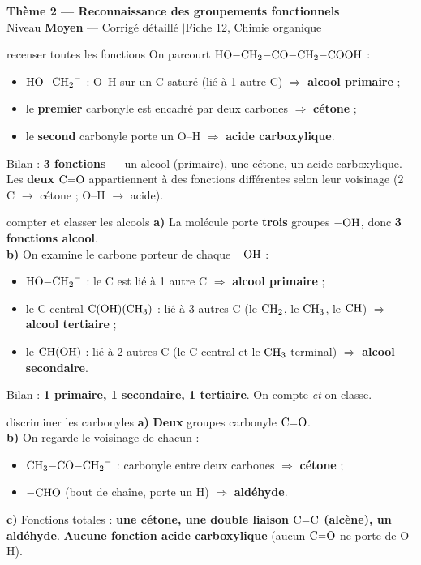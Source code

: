 \documentclass[11pt,a4paper]{article}
\newcommand{\rep}[1]{\textcolor{primarydark}{\textbf{#1}}}
\newcommand{\banner}[2]{%
\begin{tcolorbox}[enhanced,colback=excol,colframe=excol,arc=5pt,boxrule=0pt,
   left=5mm,right=5mm,top=2.5mm,bottom=2.5mm,coltext=white]
{\large\bfseries #1}\\[1pt]{\small #2}
\end{tcolorbox}\vspace{2pt}}
\begin{document}
\banner{Thème 2 — Reconnaissance des groupements fonctionnels}{Niveau \textbf{Moyen} — Corrigé détaillé \quad$\vert$\quad Fiche 12, Chimie organique}

\begin{corr}{recenser toutes les fonctions}
On parcourt $\ce{HO-CH2-CO-CH2-COOH}$ :
\begin{itemize}[leftmargin=1.6em,itemsep=1pt]
  \item $\ce{HO-CH2-}$ : O--H sur un C saturé (lié à 1 autre C) $\Rightarrow$ \rep{alcool primaire} ;
  \item le \textbf{premier} carbonyle est encadré par deux carbones $\Rightarrow$ \rep{cétone} ;
  \item le \textbf{second} carbonyle porte un O--H $\Rightarrow$ \rep{acide carboxylique}.
\end{itemize}
Bilan : \rep{3 fonctions} — un alcool (primaire), une cétone, un acide carboxylique. Les \textbf{deux} $\ce{C=O}$ appartiennent à des fonctions différentes selon leur voisinage (2 C $\to$ cétone ; O--H $\to$ acide).
\end{corr}

\begin{corr}{compter et classer les alcools}
\textbf{a)} La molécule porte \rep{trois} groupes $\ce{-OH}$, donc \rep{3 fonctions alcool}.\\
\textbf{b)} On examine le carbone porteur de chaque $\ce{-OH}$ :
\begin{itemize}[leftmargin=1.6em,itemsep=1pt]
  \item $\ce{HO-CH2-}$ : le C est lié à 1 autre C $\Rightarrow$ \rep{alcool primaire} ;
  \item le C central $\ce{C(OH)(CH3)}$ : lié à 3 autres C (le $\ce{CH2}$, le $\ce{CH3}$, le $\ce{CH}$) $\Rightarrow$ \rep{alcool tertiaire} ;
  \item le $\ce{CH(OH)}$ : lié à 2 autres C (le C central et le $\ce{CH3}$ terminal) $\Rightarrow$ \rep{alcool secondaire}.
\end{itemize}
Bilan : \rep{1 primaire, 1 secondaire, 1 tertiaire}. On compte \emph{et} on classe.
\end{corr}

\begin{corr}{discriminer les carbonyles}
\textbf{a)} \rep{Deux} groupes carbonyle $\ce{C=O}$.\\
\textbf{b)} On regarde le voisinage de chacun :
\begin{itemize}[leftmargin=1.6em,itemsep=1pt]
  \item $\ce{CH3-CO-CH2-}$ : carbonyle entre deux carbones $\Rightarrow$ \rep{cétone} ;
  \item $\ce{-CHO}$ (bout de chaîne, porte un H) $\Rightarrow$ \rep{aldéhyde}.
\end{itemize}
\textbf{c)} Fonctions totales : \rep{une cétone, une double liaison $\ce{C=C}$ (alcène), un aldéhyde}. \rep{Aucune fonction acide carboxylique} (aucun $\ce{C=O}$ ne porte de O--H).
\end{corr}
\end{document}
